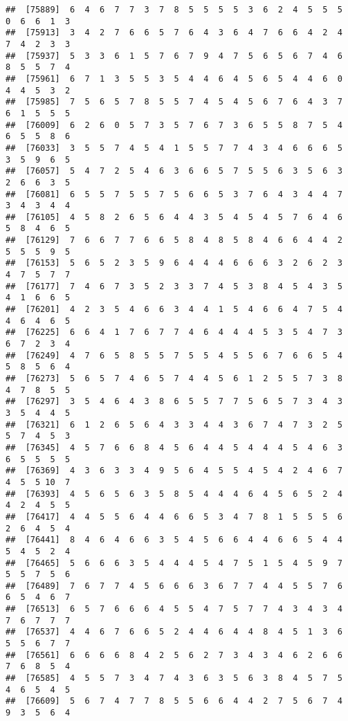 \documentclass[
]{book}
\begin{document}
\begin{verbatim}
##  [75889]  6  4  6  7  7  3  7  8  5  5  5  5  3  6  2  4  5  5  5  0  6  6  1  3
##  [75913]  3  4  2  7  6  6  5  7  6  4  3  6  4  7  6  6  4  2  4  7  4  2  3  3
##  [75937]  5  3  3  6  1  5  7  6  7  9  4  7  5  6  5  6  7  4  6  8  5  5  7  4
##  [75961]  6  7  1  3  5  5  3  5  4  4  6  4  5  6  5  4  4  6  0  4  4  5  3  2
##  [75985]  7  5  6  5  7  8  5  5  7  4  5  4  5  6  7  6  4  3  7  6  1  5  5  5
##  [76009]  6  2  6  0  5  7  3  5  7  6  7  3  6  5  5  8  7  5  4  6  5  5  8  6
##  [76033]  3  5  5  7  4  5  4  1  5  5  7  7  4  3  4  6  6  6  5  3  5  9  6  5
##  [76057]  5  4  7  2  5  4  6  3  6  6  5  7  5  5  6  3  5  6  3  2  6  6  3  5
##  [76081]  6  5  5  7  5  5  7  5  6  6  5  3  7  6  4  3  4  4  7  3  4  3  4  4
##  [76105]  4  5  8  2  6  5  6  4  4  3  5  4  5  4  5  7  6  4  6  5  8  4  6  5
##  [76129]  7  6  6  7  7  6  6  5  8  4  8  5  8  4  6  6  4  4  2  5  5  5  9  5
##  [76153]  5  6  5  2  3  5  9  6  4  4  4  6  6  6  3  2  6  2  3  4  7  5  7  7
##  [76177]  7  4  6  7  3  5  2  3  3  7  4  5  3  8  4  5  4  3  5  4  1  6  6  5
##  [76201]  4  2  3  5  4  6  6  3  4  4  1  5  4  6  6  4  7  5  4  4  6  4  6  5
##  [76225]  6  6  4  1  7  6  7  7  4  6  4  4  4  5  3  5  4  7  3  6  7  2  3  4
##  [76249]  4  7  6  5  8  5  5  7  5  5  4  5  5  6  7  6  6  5  4  5  8  5  6  4
##  [76273]  5  6  5  7  4  6  5  7  4  4  5  6  1  2  5  5  7  3  8  4  7  8  5  5
##  [76297]  3  5  4  6  4  3  8  6  5  5  7  7  5  6  5  7  3  4  3  3  5  4  4  5
##  [76321]  6  1  2  6  5  6  4  3  3  4  4  3  6  7  4  7  3  2  5  5  7  4  5  3
##  [76345]  4  5  7  6  6  8  4  5  6  4  4  5  4  4  4  5  4  6  3  6  5  5  5  5
##  [76369]  4  3  6  3  3  4  9  5  6  4  5  5  4  5  4  2  4  6  7  4  5  5 10  7
##  [76393]  4  5  6  5  6  3  5  8  5  4  4  4  6  4  5  6  5  2  4  4  2  4  5  5
##  [76417]  4  4  5  5  6  4  4  6  6  5  3  4  7  8  1  5  5  5  6  2  6  4  5  4
##  [76441]  8  4  6  4  6  6  3  5  4  5  6  6  4  4  6  6  5  4  4  5  4  5  2  4
##  [76465]  5  6  6  6  3  5  4  4  4  5  4  7  5  1  5  4  5  9  7  5  5  7  5  6
##  [76489]  7  6  7  7  4  5  6  6  6  3  6  7  7  4  4  5  5  7  6  6  5  4  6  7
##  [76513]  6  5  7  6  6  6  4  5  5  4  7  5  7  7  4  3  4  3  4  7  6  7  7  7
##  [76537]  4  4  6  7  6  6  5  2  4  4  6  4  4  8  4  5  1  3  6  5  5  6  7  7
##  [76561]  6  6  6  6  8  4  2  5  6  2  7  3  4  3  4  6  2  6  6  7  6  8  5  4
##  [76585]  4  5  5  7  3  4  7  4  3  6  3  5  6  3  8  4  5  7  5  4  6  5  4  5
##  [76609]  5  6  7  4  7  7  8  5  5  6  6  4  4  2  7  5  6  7  4  9  3  5  6  4

\end{verbatim}
\end{document}
